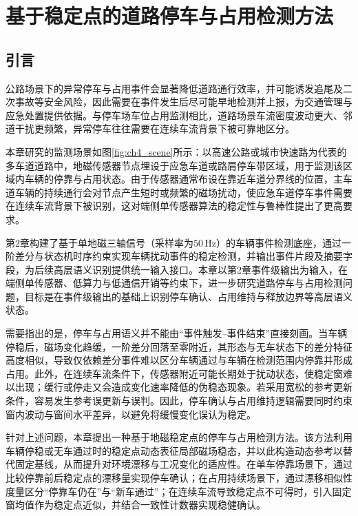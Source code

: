 \documentclass{xdupgthesis}
\begin{document}
\chapter{基于稳定点的道路停车与占用检测方法}
\label{chap:ch4_parking}

\section{引言}
\label{sec:ch4_intro}

公路场景下的异常停车与占用事件会显著降低道路通行效率，并可能诱发追尾及二次事故等安全风险，因此需要在事件发生后尽可能早地检测并上报，为交通管理与应急处置提供依据。与停车场车位占用监测相比，道路场景车流密度波动更大、邻道干扰更频繁，异常停车往往需要在连续车流背景下被可靠地区分。

本章研究的监测场景如图\ref{fig:ch4_scene}所示：以高速公路或城市快速路为代表的多车道道路中，地磁传感器节点埋设于应急车道或路肩停车带区域，用于监测该区域内车辆的停靠与占用状态。由于传感器通常布设在靠近车道分界线的位置，主车道车辆的持续通行会对节点产生短时或频繁的磁场扰动，使应急车道停车事件需要在连续车流背景下被识别，这对端侧单传感器算法的稳定性与鲁棒性提出了更高要求。

第2章构建了基于单地磁三轴信号（采样率为$50\,\mathrm{Hz}$）的车辆事件检测底座，通过一阶差分与状态机时序约束实现车辆扰动事件的稳定检测，并输出事件片段及摘要字段，为后续高层语义识别提供统一输入接口。本章以第2章事件级输出为输入，在端侧单传感器、低算力与低通信开销等约束下，进一步研究道路停车与占用检测问题，目标是在事件级输出的基础上识别停车确认、占用维持与释放边界等高层语义状态。

需要指出的是，停车与占用语义并不能由“事件触发--事件结束”直接刻画。当车辆停稳后，磁场变化趋缓，一阶差分回落至零附近，其形态与无车状态下的差分特征高度相似，导致仅依赖差分事件难以区分车辆通过与车辆在检测范围内停靠并形成占用。此外，在连续车流条件下，传感器附近可能长期处于扰动状态，使稳定窗难以出现；缓行或停走又会造成变化速率降低的伪稳态现象。若采用宽松的参考更新条件，容易发生参考误更新与误判。因此，停车确认与占用维持逻辑需要同时约束窗内波动与窗间水平差异，以避免将缓慢变化误认为稳定。

针对上述问题，本章提出一种基于地磁稳定点的停车与占用检测方法。该方法利用车辆停稳或无车通过时的稳定点动态表征局部磁场稳态，并以此构造动态参考以替代固定基线，从而提升对环境漂移与工况变化的适应性。在单车停靠场景下，通过比较停靠前后稳定点的漂移量实现停车确认；在占用持续场景下，通过漂移相似性度量区分“停靠车仍在”与“新车通过”；在连续车流导致稳定点不可得时，引入固定窗均值作为稳定点近似，并结合一致性计数器实现稳健确认。
\end{document}
